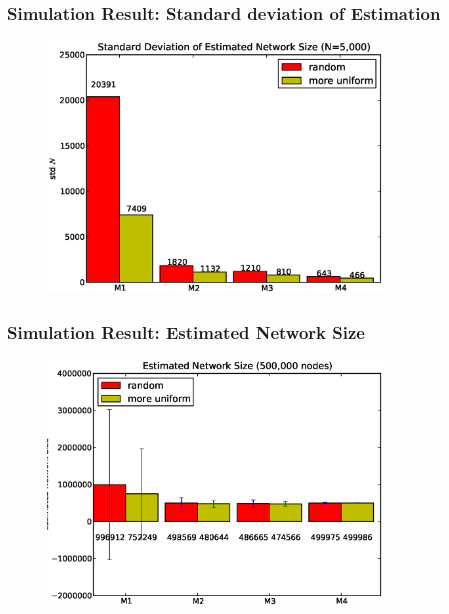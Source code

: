 \documentclass[red]{beamer}
\begin{document}
\begin{frame}
\frametitle{Simulation Result: Standard deviation of Estimation}
\begin{figure}
\centering
\includegraphics[width=3.5in]{figs/size5k_std}
\end{figure}
\end{frame}
\begin{frame}
\frametitle{Simulation Result: Estimated Network Size}
\begin{figure}
\centering
\includegraphics[width=3.5in]{figs/size500k}
\end{figure}
\end{frame}
\end{document}
